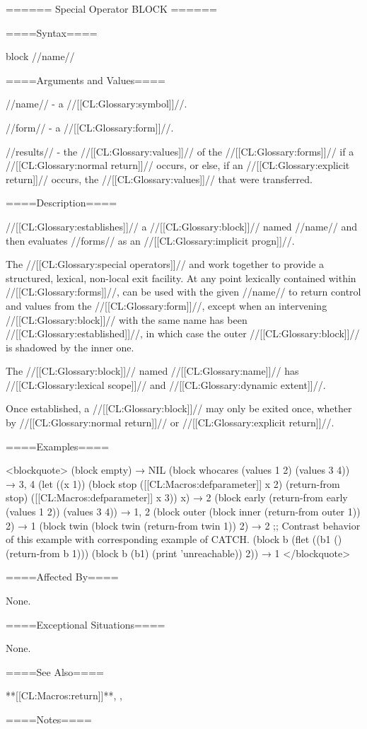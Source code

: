 ====== Special Operator BLOCK ======

====Syntax====

\DefspecWithValues block {//name// } {}

====Arguments and Values====

//name// - a //[[CL:Glossary:symbol]]//.

//form// - a //[[CL:Glossary:form]]//.

//results// - the //[[CL:Glossary:values]]// of the //[[CL:Glossary:forms]]// if a //[[CL:Glossary:normal return]]// occurs, or else, if an //[[CL:Glossary:explicit return]]// occurs, the //[[CL:Glossary:values]]// that were transferred.

====Description====

 //[[CL:Glossary:establishes]]// a //[[CL:Glossary:block]]// named //name// and then evaluates //forms// as an //[[CL:Glossary:implicit progn]]//.

The //[[CL:Glossary:special operators]]//  and  work together to provide a structured, lexical, non-local exit facility. At any point lexically contained within //[[CL:Glossary:forms]]//,  can be used with the given //name// to return control and values from the  //[[CL:Glossary:form]]//, except when an intervening //[[CL:Glossary:block]]// with the same name has been //[[CL:Glossary:established]]//, in which case the outer //[[CL:Glossary:block]]// is shadowed by the inner one.

The //[[CL:Glossary:block]]// named //[[CL:Glossary:name]]// has //[[CL:Glossary:lexical scope]]// and //[[CL:Glossary:dynamic extent]]//.

Once established, a //[[CL:Glossary:block]]// may only be exited once, whether by //[[CL:Glossary:normal return]]// or //[[CL:Glossary:explicit return]]//.

====Examples====

<blockquote> (block empty) → NIL (block whocares (values 1 2) (values 3 4)) → 3, 4 (let ((x 1)) (block stop ([[CL:Macros:defparameter]] x 2) (return-from stop) ([[CL:Macros:defparameter]] x 3)) x) → 2 (block early (return-from early (values 1 2)) (values 3 4)) → 1, 2 (block outer (block inner (return-from outer 1)) 2) → 1 (block twin (block twin (return-from twin 1)) 2) → 2 ;; Contrast behavior of this example with corresponding example of CATCH. (block b (flet ((b1 () (return-from b 1))) (block b (b1) (print 'unreachable)) 2)) → 1 </blockquote>

====Affected By====

None.

====Exceptional Situations====

None.

====See Also====

**[[CL:Macros:return]]**, , {\secref\Evaluation}

====Notes====

